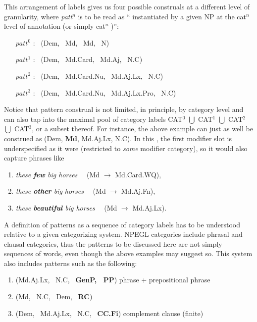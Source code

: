 \documentclass[output=paper,colorlinks,citecolor=brown,draft]{langscibook}
\begin{document}
This arrangement of labels gives us four possible  construals  at a different level of granularity,  
where \textit{patt$^n$} is to be read as `` instantiated by a given NP at the cat$^n$ level of annotation (or simply cat$^n$ )'':  

\begin{enumerate}
   \item[$patt^0$]:  \ (Dem, \ Md, \ Md, \ N)
   \item[$patt^1$]: \  (Dem, \ Md.Card, \ Md.Aj, \ N.C)
   \item[$patt^2$]:  \ (Dem, \ Md.Card.Nu, \ Md.Aj.Lx, \ N.C)
   \item[$patt^3$]: \  (Dem, \ Md.Card.Nu, \ Md.Aj.Lx.Pro, \ N.C)
\end{enumerate}  

Notice that pattern construal is not limited,  in principle, by category level and can also tap into the maximal pool   of category labels CAT$^0$ $\bigcup$ CAT$^1$ $\bigcup$ CAT$^2$ $\bigcup$ CAT$^3$, or a subset thereof.  For instance, the above example can just as well be construed as  (Dem, \textbf{Md}, Md.Aj.Lx, N.C). In this , the first modifier slot is underspecified as it were (restricted to \textit{some} modifier category), so it would also capture  phrases like 

\begin{enumerate}[$\bullet$]
   \item   \textit{these \textbf{few} big horses} \ \  (Md $\rightarrow$ Md.Card.WQ),  
   \item  \textit{these \textbf{other} big horses} \ \ (Md $\rightarrow$ Md.Aj.Fn),  
   \item   \textit{these \textbf{beautiful} big horses} \ \  (Md $\rightarrow$ Md.Aj.Lx).  
\end{enumerate}  

A definition of patterns as a sequence of category labels has to be understood relative to a given categorizing system. NPEGL categories include phrasal and clausal categories, thus the patterns to be discussed here are not simply sequences of words, even though the above examples may suggest so. This system also includes patterns such as the following: 

\begin{enumerate}[$\bullet$]
   \item   (Md.Aj.Lx, \ N.C, \ \textbf{GenP, \ PP})  \hfill {} phrase + prepositional phrase
   \item   (Md, \ N.C, \ Dem, \ \textbf{RC}) \hfill {}
   \item   (Dem, \ Md.Aj.Lx, \ N.C, \ \textbf{CC.Fi}) \hfill complement clause (finite)
\end{enumerate}  
\end{document}
